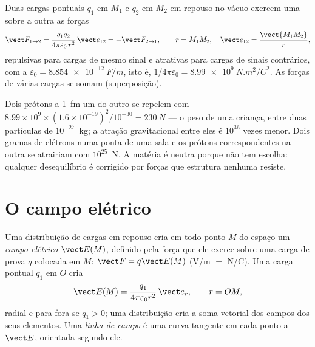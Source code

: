 \begin{theorem}\label{thm:b1:electrostatics-gauss:coulomb}
Duas cargas pontuais $q_1$ em $M_1$ e $q_2$ em $M_2$ em repouso no vácuo
exercem uma sobre a outra as forças
\[
\vect F_{1 \to 2} = \frac{q_1q_2}{4\pi\varepsilon_0\,r^2}\,\vect e_{12} = -\vect F_{2 \to 1},
\qquad r = M_1M_2,\quad \vect e_{12} = \frac{\vect{M_1M_2}}{r},
\]
repulsivas para cargas de mesmo sinal e atrativas para cargas de sinais
contrários, com a \emph{} $\varepsilon_0 = \qty{8.854e-12}{F/m}$, isto é,
$1/4\pi\varepsilon_0 = \qty{8.99e9}{N.m^2/C^2}$. As forças de várias cargas se somam
(superposição).
\end{theorem}
\admitted

\begin{example}\label{ex:b1:electrostatics-gauss:strong}
Dois prótons a \qty{1}{fm} um do outro se repelem com $8.99 \times 10^9 \times (1.6 \times
10^{-19})^2/10^{-30} = \qty{230}{N}$ --- o peso de uma criança, entre duas
partículas de $10^{-27}$~kg; a atração gravitacional entre eles é
$10^{36}$ vezes menor. Dois gramas de elétrons numa ponta de uma sala
e os prótons correspondentes na outra se atrairiam com $10^{25}$~N.
A matéria é neutra porque não tem escolha: qualquer desequilíbrio é corrigido
por forças que estrutura nenhuma resiste.
\end{example}

\section{O campo elétrico}

\begin{definition}\label{def:b1:electrostatics-gauss:field}
Uma distribuição de cargas em repouso cria em todo ponto $M$ do espaço
um \emph{campo elétrico} $\vect E(M)$, definido pela força que ele exerce sobre
uma carga de prova $q$ colocada em $M$: $\vect F = q\vect E(M)$ (\unit{V/m} $=$
\unit{N/C}). Uma carga pontual $q_1$ em $O$ cria
\[
\vect E(M) = \frac{q_1}{4\pi\varepsilon_0 r^2}\,\vect e_r , \qquad r = OM ,
\]
radial e para fora se $q_1 > 0$; uma distribuição cria a soma vetorial dos
campos dos seus elementos. Uma \emph{linha de campo} é uma curva tangente em
cada ponto a $\vect E$, orientada segundo ele.
\end{definition}

